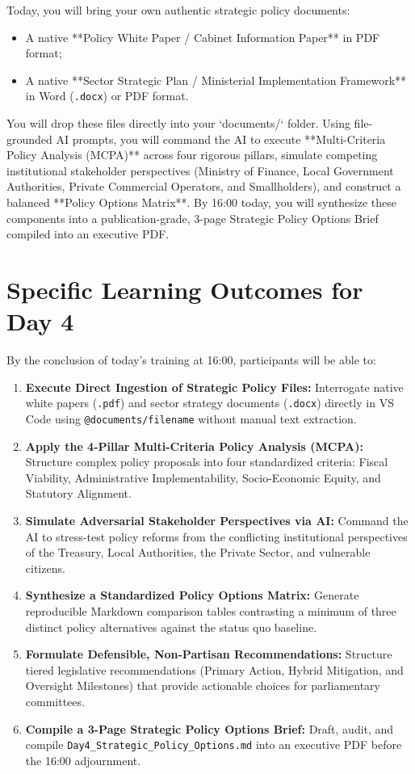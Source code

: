 \documentclass[11pt, a4paper]{report}
\begin{document}
Today, you will bring your own authentic strategic policy documents:
\begin{itemize}[label=-]
    \item A native **Policy White Paper / Cabinet Information Paper** in PDF format;
    \item A native **Sector Strategic Plan / Ministerial Implementation Framework** in Word (\texttt{.docx}) or PDF format.
\end{itemize}

You will drop these files directly into your `documents/` folder. Using file-grounded AI prompts, you will command the AI to execute **Multi-Criteria Policy Analysis (MCPA)** across four rigorous pillars, simulate competing institutional stakeholder perspectives (Ministry of Finance, Local Government Authorities, Private Commercial Operators, and Smallholders), and construct a balanced **Policy Options Matrix**. By 16:00 today, you will synthesize these components into a publication-grade, 3-page Strategic Policy Options Brief compiled into an executive PDF.

\section{Specific Learning Outcomes for Day 4}
By the conclusion of today's training at 16:00, participants will be able to:
\begin{enumerate}[label=\textbf{4.\arabic*}]
    \item \textbf{Execute Direct Ingestion of Strategic Policy Files:} Interrogate native white papers (\texttt{.pdf}) and sector strategy documents (\texttt{.docx}) directly in VS Code using \texttt{@documents/filename} without manual text extraction.
    \item \textbf{Apply the 4-Pillar Multi-Criteria Policy Analysis (MCPA):} Structure complex policy proposals into four standardized criteria: Fiscal Viability, Administrative Implementability, Socio-Economic Equity, and Statutory Alignment.
    \item \textbf{Simulate Adversarial Stakeholder Perspectives via AI:} Command the AI to stress-test policy reforms from the conflicting institutional perspectives of the Treasury, Local Authorities, the Private Sector, and vulnerable citizens.
    \item \textbf{Synthesize a Standardized Policy Options Matrix:} Generate reproducible Markdown comparison tables contrasting a minimum of three distinct policy alternatives against the status quo baseline.
    \item \textbf{Formulate Defensible, Non-Partisan Recommendations:} Structure tiered legislative recommendations (Primary Action, Hybrid Mitigation, and Oversight Milestones) that provide actionable choices for parliamentary committees.
    \item \textbf{Compile a 3-Page Strategic Policy Options Brief:} Draft, audit, and compile \texttt{Day4\_Strategic\_Policy\_Options.md} into an executive PDF before the 16:00 adjournment.
\end{enumerate}
\end{document}
